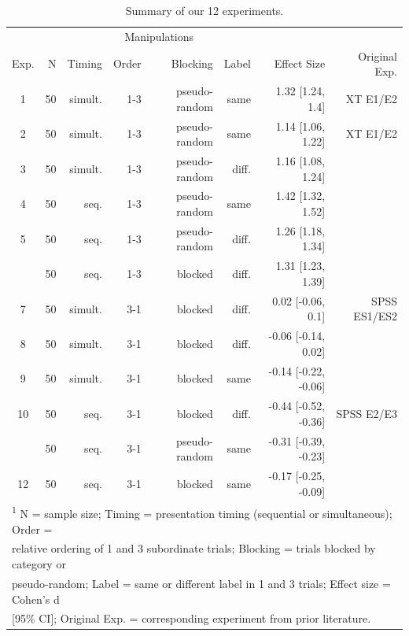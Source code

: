 \documentclass[english,floatsintext,man]{apa6}
\theoremstyle{definition}
\theoremstyle{definition}
\theoremstyle{remark}
\begin{document}
\begin{table}

\caption{\label{tab:unnamed-chunk-2}Summary of our 12 experiments.}
\centering
\fontsize{12}{14}\selectfont
\begin{tabular}[t]{crrrrrrr}
\toprule
\multicolumn{2}{c}{ } & \multicolumn{4}{c}{Manipulations} & \multicolumn{1}{c}{ } \\
\cmidrule(l{2pt}r{2pt}){3-6}
Exp. & N & Timing & Order & Blocking & Label & Effect Size & Original 
Exp.\\
\midrule
1 & 50 & simult. & 1-3 & pseudo-random & same & 1.32 [1.24, 1.4] & XT E1/E2\\
2 & 50 & simult. & 1-3 & pseudo-random & same & 1.14 [1.06, 1.22] & XT E1/E2\\
3 & 50 & simult. & 1-3 & pseudo-random & diff. & 1.16 [1.08, 1.24] & \\
4 & 50 & seq. & 1-3 & pseudo-random & same & 1.42 [1.32, 1.52] & \\
5 & 50 & seq. & 1-3 & pseudo-random & diff. & 1.26 [1.18, 1.34] & \\
\addlinespace
6 & 50 & seq. & 1-3 & blocked & diff. & 1.31 [1.23, 1.39] & \\
7 & 50 & simult. & 3-1 & blocked & diff. & 0.02 [-0.06, 0.1] & SPSS ES1/ES2\\
8 & 50 & simult. & 3-1 & blocked & diff. & -0.06 [-0.14, 0.02] & \\
9 & 50 & simult. & 3-1 & blocked & same & -0.14 [-0.22, -0.06] & \\
10 & 50 & seq. & 3-1 & blocked & diff. & -0.44 [-0.52, -0.36] & SPSS E2/E3\\
\addlinespace
11 & 50 & seq. & 3-1 & pseudo-random & same & -0.31 [-0.39, -0.23] & \\
12 & 50 & seq. & 3-1 & blocked & same & -0.17 [-0.25, -0.09] & \\
\bottomrule
\multicolumn{8}{l}{\textsuperscript{1} N = sample size; Timing = presentation timing (sequential or simultaneous); Order =}\\
\multicolumn{8}{l}{relative ordering of 1 and 3 subordinate trials; Blocking = trials blocked by category or}\\
\multicolumn{8}{l}{pseudo-random; Label = same or different label in 1 and 3 trials; Effect size = Cohen's d}\\
\multicolumn{8}{l}{[95\% CI]; Original Exp. = corresponding experiment from prior literature.}\\
\end{tabular}
\end{table}
\end{document}
